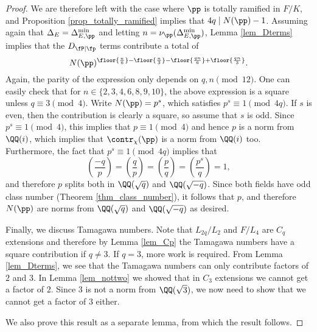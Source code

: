 \begin{proof}
    We are therefore left with the case where $\pp$ is totally ramified in $F/K$, and Proposition \ref{prop_totally_ramified} implies that $4q\mid N(\pp)-1$. Assuming again that $\Delta_E=\Delta_{E,\pp}^{\min}$ and letting $n=\nu_{\pp}(\Delta_{E,\pp}^{\min})$, Lemma \ref{lem_Dterms} implies that the $D_{\fP\mid\fp}$ terms contribute a total of 
    $$N(\pp)^{\floor{\frac{n}{6}}-\floor{\frac{n}{3}}-\floor{\frac{qn}{6}}+\floor{\frac{qn}{3}}}.$$
    Again, the parity of the expression only depends on $q,n\pmod{12}$. One can easily check that for $n\in\{2,3,4,6,8,9,10\}$, the above expression is a square unless $q\equiv 3\pmod{4}$. Write $N(\pp)=p^s$, which satisfies $p^s\equiv1\pmod{4q}$. If $s$ is even, then the contribution is clearly a square, so assume that $s$ is odd. Since $p^s\equiv1\pmod{4}$, this implies that $p\equiv1\pmod{4}$ and hence $p$ is a norm from $\QQ(i)$, which implies that $\contr_\chi(\pp)$ is a norm from $\QQ(i)$ too. Furthermore, the fact that $p^s\equiv1\pmod{4q}$ implies that
    $$\left(\frac{-q}{p}\right)=\left(\frac{q}{p}\right)=\left(\frac{p}{q}\right)=\left(\frac{p^s}{q}\right)=1,$$
    and therefore $p$ splits both in $\QQ(\sqrt{q})$ and $\QQ(\sqrt{-q})$. Since both fields have odd class number (Theorem \ref{thm_class_number}), it follows that $p$, and therefore $N(\pp)$ are norms from $\QQ(\sqrt{q})$ and $\QQ(\sqrt{-q})$ as desired. 

    Finally, we discuss Tamagawa numbers. Note that $L_{2q}/L_2$ and $F/L_4$ are $C_q$ extensions and therefore by Lemma \ref{lem_Cp} the Tamagawa numbers have a square contribution if $q\neq3$. If $q=3$, more work is required. From Lemma \ref{lem_Dterms}, we see that the Tamagawa numbers can only contribute factors of $2$ and $3$. In Lemma \ref{lem_nottwo} we showed that in $C_3$ extensions we cannot get a factor of $2$. Since $3$ is not a norm from $\QQ(\sqrt{3})$, we now need to show that we cannot get a factor of $3$ either. 
    
    We also prove this result as a separate lemma, from which the result follows.

    
\end{proof}

